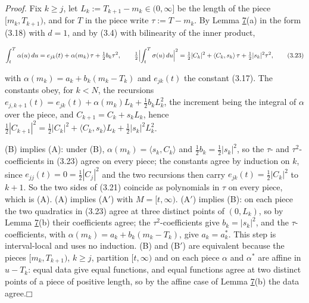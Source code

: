 \documentclass[11pt]{article}
\providecommand{\square}{\mdlgwhtsquare}
\begin{document}
\emph{Proof.} Fix \(k \ge j\), let \(L_k := T_{k+1} - m_k \in (0, \infty]\) be the length of the piece \([m_k, T_{k+1})\), and for \(T\) in the piece write \(\tau := T - m_k\). By Lemma \hyperref[res:Lemma-7]{7}(a) in the form (3.18) with \(d = 1\), and by (3.4) with bilinearity of the inner product,

\begin{equation*}
\int_t^T \alpha(u)\,du = e_{jk}(t) + \alpha(m_k)\,\tau + \tfrac12 b_k \tau^2, \qquad \tfrac12 \Bigl| \int_t^T \sigma(u)\,du \Bigr|^2 = \tfrac12 |C_k|^2 + \langle C_k, s_k \rangle\, \tau + \tfrac12 |s_k|^2 \tau^2, \tag{3.23}\label{eq:3.23}
\end{equation*}

with \(\alpha(m_k) = a_k + b_k (m_k - T_k)\) and \(e_{jk}(t)\) the constant (3.17). The constants obey, for \(k < N\), the recursions \(e_{j,k+1}(t) = e_{jk}(t) + \alpha(m_k) L_k + \tfrac12 b_k L_k^2\), the increment being the integral of \(\alpha\) over the piece, and \(C_{k+1} = C_k + s_k L_k\), hence \(\tfrac12 |C_{k+1}|^2 = \tfrac12 |C_k|^2 + \langle C_k, s_k \rangle L_k + \tfrac12 |s_k|^2 L_k^2\).

(B) implies (A): under (B), \(\alpha(m_k) = \langle s_k, C_k \rangle\) and \(\tfrac12 b_k = \tfrac12 |s_k|^2\), so the \(\tau\)- and \(\tau^2\)-coefficients in (3.23) agree on every piece; the constants agree by induction on \(k\), since \(e_{jj}(t) = 0 = \tfrac12 |C_j|^2\) and the two recursions then carry \(e_{jk}(t) = \tfrac12 |C_k|^2\) to \(k + 1\). So the two sides of (3.21) coincide as polynomials in \(\tau\) on every piece, which is (A). (A) implies (A\('\)) with \(M = [t, \infty)\). (A\('\)) implies (B): on each piece the two quadratics in (3.23) agree at three distinct points of \((0, L_k)\), so by Lemma \hyperref[res:Lemma-7]{7}(b) their coefficients agree; the \(\tau^2\)-coefficients give \(b_k = |s_k|^2\), and the \(\tau\)-coefficients, with \(\alpha(m_k) = a_k + b_k(m_k - T_k)\), give \(a_k = a^*_k\). This step is interval-local and uses no induction. (B) and (B\('\)) are equivalent because the pieces \([m_k, T_{k+1})\), \(k \ge j\), partition \([t, \infty)\) and on each piece \(\alpha\) and \(\alpha^*\) are affine in \(u - T_k\): equal data give equal functions, and equal functions agree at two distinct points of a piece of positive length, so by the affine case of Lemma \hyperref[res:Lemma-7]{7}(b) the data agree.\hfill$\square$
\end{document}
